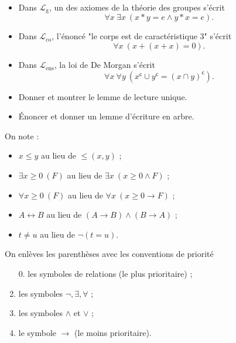 \documentclass[./main]{subfiles}
\begin{document}
  \begin{exm}
    \begin{itemize}
      \item Dans $\mathcal{L}_\mathrm{g}$, un des axiomes de la théorie des groupes s'écrit \[
        \forall x\: \exists x\: (x * y = e \land y * x = e)
        .\]
      \item Dans $\mathcal{L}_\mathrm{co}$, l'énoncé "le corps est de caractéristique 3" s'écrit \[
        \forall x\: (x + (x + x) = 0)
        .\] 
      \item Dans $\mathcal{L}_\mathrm{ens}$, la loi de De Morgan s'écrit \[
          \forall x\: \forall y\: (x^\mathsf{c} \cup y^\mathsf{c} = (x \cap y)^\mathsf{c})
        .\]
    \end{itemize}
  \end{exm}

  \begin{exo}
    \begin{itemize}
      \item Donner et montrer le lemme de lecture unique.
      \item Énoncer et donner un lemme d'écriture en arbre.
    \end{itemize}
  \end{exo}

  \begin{rmk}
    On note :
    \begin{itemize}
      \item $x \le  y$ au lieu de ${\le}(x,y)$ ;
      \item $\exists x \ge 0\: (F)$ au lieu de $\exists x\: (x \ge 0 \land F)$ ;
      \item $\forall x \ge 0\: (F)$ au lieu de $\forall x\: (x \ge 0 \to F)$ ;
      \item $A \leftrightarrow B$ au lieu de $(A \to B) \land (B \to A)$ ;
      \item $t \neq u$ au lieu de $\lnot (t = u)$.
    \end{itemize}

    On enlèves les parenthèses avec les conventions de priorité 
    \begin{enumerate}
      \item[0.] les symboles de relations (le plus prioritaire) ;
      \item les symboles $\lnot, \exists, \forall$ ;
      \item les symboles $\land$ et $\lor$ ;
      \item le symbole $\to$ (le moins prioritaire).
    \end{enumerate}
  \end{rmk}
\end{document}
